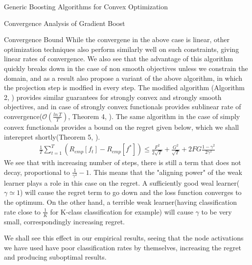 \documentclass{article}
\begin{document}
\begin{psection}{Generic Boosting Algorithms for Convex Optimization}
\begin{psubsection}{Convergence Analysis of Gradient Boost}
\begin{pssubsection}{Convergence Bound}
			While the convergene in the above case is linear, other optimization techniques also perform similarly well on such constraints, giving linear rates of convergence. We also see that the advantage of this algorithm quickly breaks down in the case of non smooth objectives unless we constrain the domain, and as a result \cite{grubb2011generalized} also propose a variant of the above algorithm, in which the projection step is modfied in every step. The modified algorithm (Algorithm 2, \cite{grubb2011generalized}) provides similar guarantees for strongly convex and strongly smooth objectives, and in case of strongly convex functionals provides sublinear rate of convergence($\mathcal{O}(\frac{ln~T}{T})$, Theorem 4, \cite{grubb2011generalized}). The same algorithm in the case of simply convex functionals provides a bound on the regret given below, which we shall interepret shortly(Theorem 5, \cite{grubb2011generalized}).
			\begin{align*}
				\frac{1}{T}\sum_{t=1}^{T}(R_{emp}[f_t]-R_{emp}[f^*])\leq \frac{F^2}{2\sqrt{T}}+\frac{G^2}{\sqrt{T}}+2FG\frac{1-\gamma^2}{2\gamma^2}
			\end{align*}
			We see that with increasing number of steps, there is still a term that does not decay, proportional to $\frac{1}{\gamma^2}-1$. This means that the "aligning power" of the weak learner plays a role in this case on the regret. A sufficiently good weal learner($\gamma\simeq 1$) will cause the regret term to go down and the loss function converges to the optimum. On the other hand, a terrible weak learner(having classification rate close to $\frac{1}{K}$ for K-class classification for example) will cause $\gamma$ to be very small, correspondingly increasing regret.

			We shall see this effect in our empirical results, seeing that the node activations we have used have poor classification rates by themselves, increasing the regret and producing suboptimal results.





		\end{pssubsection}
	\end{psubsection}

\end{psection}
\end{document}
